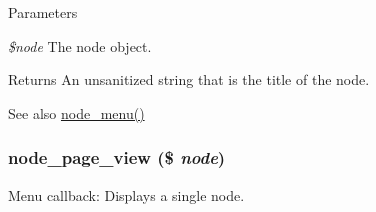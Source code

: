 \begin{DoxyParams}{Parameters}
\item[{\em \$node}]The node object.\end{DoxyParams}
\begin{DoxyReturn}{Returns}
An unsanitized string that is the title of the node.
\end{DoxyReturn}
\begin{DoxySeeAlso}{See also}
\hyperlink{node_8module_a15e8d85a7559f22b8f2c77c1d5dfac63}{node\_\-menu()} 
\end{DoxySeeAlso}
\hypertarget{node_8module_ae409793704d24e41aee23db5d7933231}{
\subsubsection[{node\_\-page\_\-view}]{\setlength{\rightskip}{0pt plus 5cm}node\_\-page\_\-view (\$ {\em node})}}
\label{node_8module_ae409793704d24e41aee23db5d7933231}
Menu callback: Displays a single node.


